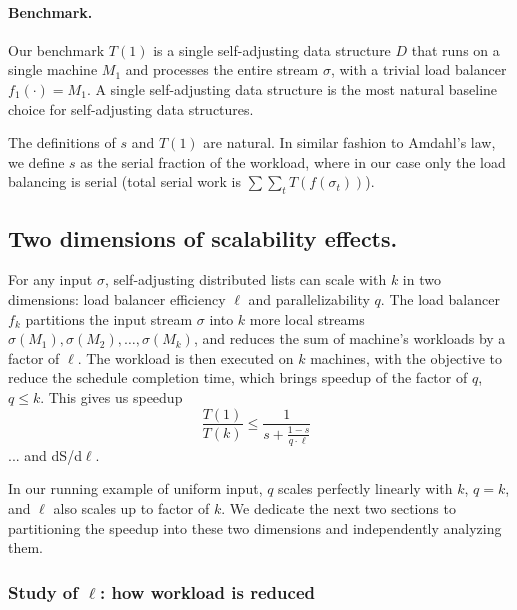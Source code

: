 

\paragraph*{Benchmark.}
Our benchmark $T(1)$ is a single self-adjusting data structure $D$ that runs on a single machine $M_1$
and processes the entire stream $\sigma$, with a trivial load balancer $f_1(\cdot) = M_1$.
A single self-adjusting data structure is the most natural baseline choice for self-adjusting data structures. 

The definitions of $s$ and $T(1)$ are natural.
In similar fashion to Amdahl's law, we define $s$ as the serial fraction of the workload, where in our case only the load balancing is serial (total serial work is $\sum \sum_t T(f(\sigma_t))$).


\subsection{Two dimensions of scalability effects.}

\begin{theorem}
For any input $\sigma$, self-adjusting distributed lists can scale with $k$ in two dimensions: 
load balancer efficiency $\ell$ and parallelizability $q$.
The load balancer $f_k$ partitions the input stream $\sigma$ into $k$ more local streams $\sigma(M_1), \sigma(M_2), \ldots, \sigma(M_k)$, and reduces the sum of machine's workloads by a factor of $\ell$. The workload is then executed on $k$ machines, with the objective to reduce the schedule completion time, which brings speedup of the factor of $q$, $q\le k$.
This gives us speedup
\begin{equation*}\label{eq:mtf-perf}
  \frac{T(1)}{T(k)} \le \frac1{s + \frac{1-s}{q \cdot \ell}} \enspace 
\end{equation*}
... and dS/d$\ell$.
\end{theorem}

In our running example of uniform input, $q$ scales perfectly linearly with $k$, $q=k$, and $\ell$ also scales up to factor of $k$. 
We dedicate the next two sections to partitioning the speedup into these two dimensions and independently analyzing them.


\subsubsection{Study of $\ell$: how workload is reduced}


